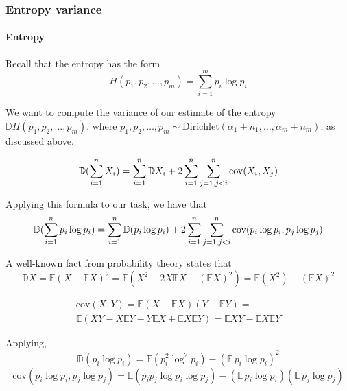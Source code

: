 \documentclass{article}
\begin{document}
\subsubsection{Entropy variance}
\paragraph{Entropy} Recall that the entropy has the form
\begin{equation*}
H(p_1, p_2, \ldots, p_m) = \sum_{i = 1}^m{p_i \log p_i}
\end{equation*}

We want to compute the variance of our estimate of the entropy $\mathbb{D}H(p_1, p_2, \ldots, p_m)$, where $p_1, p_2, \ldots, p_m \sim \textrm{Dirichlet}(\alpha_1 + n_1, \ldots, \alpha_m + n_m)$, as discussed above.

\begin{equation}
\mathbb{D}(\sum_{i = 1}^n{X_i}) = \sum_{i=1}^n{\mathbb{D}X_i} + 2 \sum_{i = 1}^n{\sum_{j = 1, \\ j < i}^n{{\textrm{cov}(X_i, X_j)}}}
\end{equation}

Applying this formula to our task, we have that
\begin{equation}
\mathbb{D}(\sum_{i = 1}^n{p_i \log{p_i}}) = \sum_{i=1}^n{\mathbb{D}(p_i \log{p_i})} + 2 \sum_{i = 1}^n{\sum_{j = 1, \\ j < i}^n{{\textrm{cov}(p_i \log{p_i}, p_j \log{p_j})}}}
\end{equation}

A well-known fact from probability theory states that
\begin{equation}
\mathbb{D}X = \mathbb{E}(X - \mathbb{E}X)^2 = \mathbb{E}(X^2 - 2X \mathbb{E}X - (\mathbb{E}X)^2) = \mathbb{E}(X^2) - (\mathbb{E}X)^2
\end{equation}

\begin{multline}
\textrm{cov}(X, Y) = \mathbb{E}(X - \mathbb{E}X)(Y - \mathbb{E}Y) = \\ \mathbb{E}(XY - X \mathbb{E}Y - Y \mathbb{E}X + \mathbb{E}X\mathbb{E}Y) = \mathbb{E}XY - \mathbb{E}X\mathbb{E}Y
\end{multline}

Applying,
\begin{equation}
\mathbb{D}(p_i \log{p_i}) = \mathbb{E}(p_i^2 \log^2{p_i}) - (\mathbb{E} \, p_i \log{p_i})^2 
\end{equation}
\begin{equation}
\textrm{cov}(p_i \log{p_i}, p_j \log{p_j}) = \mathbb{E}(p_i p_j \log{p_i} \log{p_j}) - (\mathbb{E} \, p_i \log{p_i})(\mathbb{E} \, p_j \log{p_j})
\end{equation}
\end{document}
